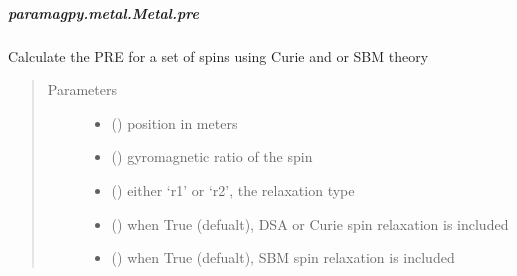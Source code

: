 \documentclass[a4paper,10pt,english,openany,oneside]{sphinxmanual}
\begin{document}
\begin{fulllineitems}
\begin{fulllineitems}
\subparagraph{paramagpy.metal.Metal.pre}
\label{\detokenize{reference/generated/paramagpy.metal.Metal.pre:paramagpy-metal-metal-pre}}\label{\detokenize{reference/generated/paramagpy.metal.Metal.pre::doc}}

\begin{fulllineitems}
\label{\detokenize{reference/generated/paramagpy.metal.Metal.pre:paramagpy.metal.Metal.pre}}
\sphinxAtStartPar
Calculate the PRE for a set of spins using Curie and or SBM theory
\begin{quote}\begin{description}
\item[{Parameters}] \leavevmode\begin{itemize}
\item {} 
\sphinxAtStartPar
{} () \textendash{} position in meters

\item {} 
\sphinxAtStartPar
{} () \textendash{} gyromagnetic ratio of the spin

\item {} 
\sphinxAtStartPar
{} () \textendash{} either ‘r1’ or ‘r2’, the relaxation type

\item {} 
\sphinxAtStartPar
{} (\sphinxstyleliteralemphasis{\sphinxupquote{ (}}\sphinxstyleliteralemphasis{\sphinxupquote{)}}) \textendash{} when True (defualt), DSA or Curie spin relaxation is included

\item {} 
\sphinxAtStartPar
{} (\sphinxstyleliteralemphasis{\sphinxupquote{ (}}\sphinxstyleliteralemphasis{\sphinxupquote{)}}) \textendash{} when True (defualt), SBM spin relaxation is included


\end{itemize}
\end{description}
\end{quote}
\end{fulllineitems}
\end{fulllineitems}
\end{fulllineitems}
\end{document}
